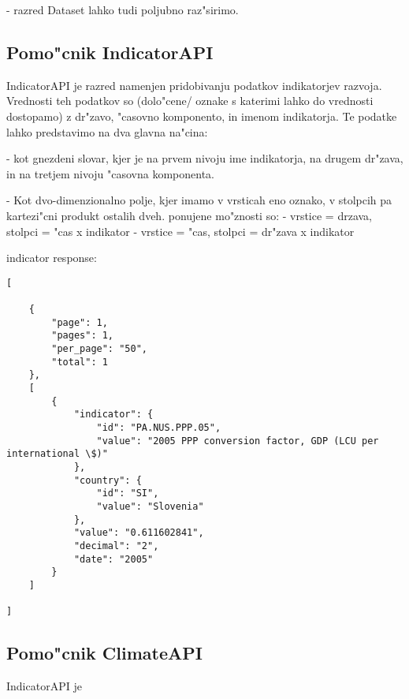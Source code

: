 - razred Dataset lahko tudi poljubno raz"sirimo.



\subsection{Pomo"cnik IndicatorAPI}

IndicatorAPI je razred namenjen pridobivanju podatkov indikatorjev razvoja.
Vrednosti teh podatkov so (dolo"cene/ oznake s katerimi lahko do vrednosti
dostopamo) z dr"zavo, "casovno komponento, in imenom indikatorja. Te podatke
lahko predstavimo na dva glavna na"cina:

 - kot gnezdeni slovar, kjer je na prvem nivoju ime indikatorja, na drugem
   dr"zava, in na tretjem nivoju "casovna komponenta.

 - Kot dvo-dimenzionalno polje, kjer imamo v vrsticah eno oznako, v stolpcih
   pa kartezi"cni produkt ostalih dveh. ponujene mo"znosti so:
   - vrstice = drzava, stolpci = "cas x indikator
   - vrstice = "cas, stolpci = dr"zava x indikator






% 
% 
% 
% 
% 
% 


indicator response:

\begin{verbatim}
[

    {
        "page": 1,
        "pages": 1,
        "per_page": "50",
        "total": 1
    },
    [
        {
            "indicator": {
                "id": "PA.NUS.PPP.05",
                "value": "2005 PPP conversion factor, GDP (LCU per international \$)"
            },
            "country": {
                "id": "SI",
                "value": "Slovenia"
            },
            "value": "0.611602841",
            "decimal": "2",
            "date": "2005"
        }
    ]

]
\end{verbatim}


\subsection{Pomo"cnik ClimateAPI}

IndicatorAPI je 



% 
% 



